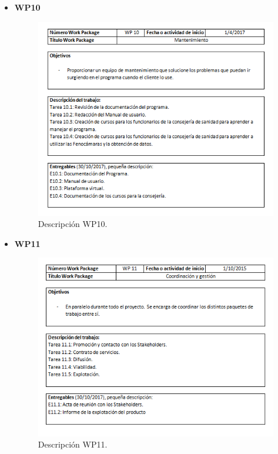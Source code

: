 \documentclass[12pt,oneside,a4paper]{article}
\numberwithin{figure}{section}
\begin{document}
\begin{itemize}
\item \textbf{WP10}

\begin{figure}[H]
\begin{center}
\includegraphics[scale=1]{WP10.png}
\caption{Descripción WP10.}
\label{fig:WP10}
\end{center}
\end{figure}
\clearpage

\item \textbf{WP11}

\begin{figure}[H]
\begin{center}
\includegraphics[scale=1]{WP11.png}
\caption{Descripción WP11.}
\label{fig:WP11}
\end{center}
\end{figure}
\clearpage


\end{itemize}
\end{document}
